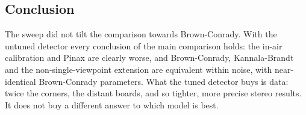 \subsection{Conclusion}
The sweep did not tilt the comparison towards Brown-Conrady. With the untuned detector every conclusion of the
main comparison holds: the in-air calibration and Pinax are clearly worse, and Brown-Conrady, Kannala-Brandt and
the non-single-viewpoint extension are equivalent within noise, with near-identical Brown-Conrady parameters.
What the tuned detector buys is data: twice the corners, the distant boards, and so tighter, more precise
stereo results. It does not buy a different answer to which model is best.
